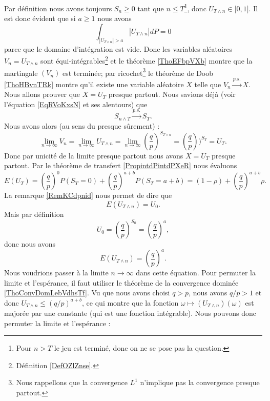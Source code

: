 Par définition nous avons toujours \( S_n\geq 0\) tant que \( n\leq T\)\footnote{Pour \( n>T\) le jeu est terminé, donc on ne se pose pas la question.}, donc \( U_{T\wedge n}\in\mathopen[ 0 , 1 \mathclose]\). Il est donc évident que si \( a\geq 1\) nous avons
\begin{equation}
    \int_{| U_{T\wedge n} |>a}| U_{T\wedge n} |dP=0
\end{equation}
parce que le domaine d'intégration est vide. Donc les variables aléatoires \( V_n=U_{T\wedge n}\) sont équi-intégrables\footnote{Définition \ref{DefOZlZnse}.} et le théorème \ref{ThoEFbpVXb} montre que la martingale \( (V_n)\) est terminée; par ricochet\footnote{Nous rappellons que la convergence \( L^1\) n'implique pas la convergence presque partout.} le théorème de Doob \ref{ThoHBvnTRk} montre qu'il existe une variable aléatoire \( X\) telle que $V_n\stackrel{p.s.}{\longrightarrow}X$. Nous allons prouver que \( X=U_T\) presque partout. Nous savions déjà (voir l'équation \eqref{EqRVoKxsN} et ses alentours) que
\begin{equation}
    S_{n\wedge T}\stackrel{p.s.}{\longrightarrow}S_T.
\end{equation}
Nous avons alors (au sens du presque sûrement) :
\begin{equation}
    \lim_{n\to \infty} V_n=\lim_{n\to \infty} U_{T\wedge n}=\lim_{n\to \infty} \left( \frac{ q }{ p } \right)^{S_{T\wedge n}}=\left( \frac{ q }{ p } \right))^{S_T}=U_T.
\end{equation}
Donc par unicité de la limite presque partout nous avons \( X=U_T\) presque partout. Par le théorème de transfert \ref{PropintdPintdPXeR} nous évaluons
\begin{equation}    \label{EqYFycUag}
    E(U_T)=\left( \frac{ q }{ p } \right)^0P(S_T=0)+\left( \frac{ q }{ p } \right)^{a+b}P(S_T=a+b)=(1-\rho)+\left( \frac{ q }{ p } \right)^{a+b}\rho.
\end{equation}
La remarque \ref{RemKCdpnid} nous permet de dire que
\begin{equation}
    E(U_{T\wedge n})=U_0.
\end{equation}
Mais par définition
\begin{equation}
    U_0=\left( \frac{ q }{ p } \right)^{S_0}=\left( \frac{ q }{ p } \right)^a,
\end{equation}
donc nous avons
\begin{equation}
    E(U_{T\wedge n})=\left( \frac{ q }{ p } \right)^a.
\end{equation}
Nous voudrions passer à la limite \( n\to \infty\) dans cette équation. Pour permuter la limite et l'espérance, il faut utiliser le théorème de la convergence dominée \ref{ThoConvDomLebVdhsTf}. Vu que nous avons choisi \( q>p\), nous avons \( q/p>1\) et donc \( U_{T\wedge n}\leq (q/p)^{a+b}\), ce qui montre que la fonction \( \omega\mapsto (U_{T\wedge n})(\omega)\) est majorée par une constante (qui est une fonction intégrable). Nous pouvons donc permuter la limite et l'espérance :

